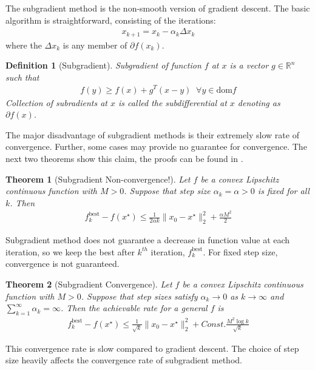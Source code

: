 \documentclass[10pt]{article} %
\newtheorem{theorem}{Theorem}
\newtheorem{definition}{Definition}[section]
\begin{document}
The subgradient method is the non-smooth version of gradient descent. The basic algorithm is straightforward, consisting of the iterations:
    \begin{align*}
        x_{k+1}=x_k-\alpha_k\Delta x_k
    \end{align*}
    where the $\Delta x_k$ is any member of $\partial f(x_k)$.
\begin{definition}[Subgradient]
    Subgradient of function $f$ at $x$ is a vector $g\in\mathbb{R}^n$ such that
    \begin{align*}
        f(y)\geq f(x)+g^T(x-y) \;\;\forall y\in\mathrm{dom}f
    \end{align*}
    Collection of subradients at $x$ is called the subdifferential at $x$ denoting as $\partial f(x)$.
\end{definition}
The major disadvantage of subgradient methods is their extremely slow rate of convergence. Further, some cases may provide no guarantee for convergence. The next two theorems show this claim, the proofs can be found in \citep{boyd2003subgradient}.

\begin{theorem}[Subgradient Non-convergence!]
    Let $f$ be a convex Lipschitz continuous function with $M>0$. Suppose that step size $\alpha_k=\alpha > 0$ is fixed for all $k$. Then
    \begin{align*}
        f_k^{\text{best}}-f(x^\star)\leq\frac{1}{2\alpha k}\|x_0-x^\star\|_2^2+\frac{\alpha M^2}{2}
    \end{align*}
    \end{theorem}
Subgradient method does not guarantee a decrease in function value at each iteration, so we keep the best after $k^{th}$ iteration, $f_k^{\text{best}}$. For fixed step size, convergence is not guaranteed.

\begin{theorem}[Subgradient Convergence]
    Let $f$ be a convex Lipschitz continuous function with $M>0$. Suppose that step sizes satisfy $\alpha_k\rightarrow 0$ as $k\rightarrow\infty$ and $\sum_{k=1}^\infty\alpha_k=\infty$. Then the achievable rate for a general $f$ is
    \begin{align*}
        f_k^{\text{best}}-f(x^\star)\leq\frac{1}{\sqrt{k}}\|x_0-x^\star\|_2^2+Const.\frac{ M^2\log k}{\sqrt{k}}
    \end{align*}
    \end{theorem}

This convergence rate is slow compared to gradient descent. The choice of step size heavily affects the convergence rate of subgradient method.
\end{document}

